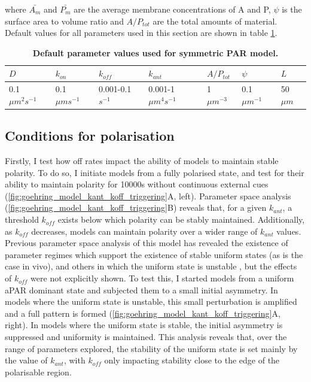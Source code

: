 \documentclass[12pt]{"report"}
\newcommand{\mycaption}[2]{\caption[#1]{\textbf{#1.} #2}}
\begin{document}
where $\bar{A_m}$ and $\bar{P_m}$ are the average membrane concentrations of A and P, $\psi$ is the surface area to volume ratio and $A/P_{tot}$ are the total amounts of material. Default values for all parameters used in this section are shown in table \ref{tab:goehring_model_default_parameters}.

\begin{table}[]
\scriptsize
\begin{tabular}{lllllll}
$D$ & $k_{on}$ & $k_{off}$ & $k_{ant}$ & $A/P_{tot}$ & $\psi$ & $L$ \\ \hline
0.1 $\mu m^2 s^{-1}$ & 0.1 $\mu m s^{-1}$ & 0.001-0.1 $s^{-1}$ & 0.001-1 $\mu m^4 s^{-1}$ & 1 $\mu m^{-3}$ & 0.1 $\mu m^{-1}$ & 50 $\mu m$
\end{tabular}
\mycaption{Default parameter values used for symmetric PAR model}{}
\label{tab:goehring_model_default_parameters}
\end{table}

\subsection{Conditions for polarisation}

Firstly, I test how off rates impact the ability of models to maintain stable polarity. To do so, I initiate models from a fully polarised state, and test for their ability to maintain polarity for 10000s without continuous external cues (\ref{fig:goehring_model_kant_koff_triggering}A, left). Parameter space analysis (\cref{fig:goehring_model_kant_koff_triggering}B) reveals that, for a given $k_{ant}$, a threshold $k_{off}$ exists below which polarity can be stably maintained. Additionally, as $k_{off}$ decreases, models can maintain polarity over a wider range of $k_{ant}$ values.\\

Previous parameter space analysis of this model has revealed the existence of parameter regimes which support the existence of stable uniform states (as is the case in vivo), and others in which the uniform state is unstable \citep{Goehring2011a, Trong2014}, but the effects of $k_{off}$ were not explicitly shown. To test this, I started models from a uniform aPAR dominant state and subjected them to a small initial asymmetry. In models where the uniform state is unstable, this small perturbation is amplified and a full pattern is formed (\ref{fig:goehring_model_kant_koff_triggering}A, right). In models where the uniform state is stable, the initial asymmetry is suppressed and uniformity is maintained. This analysis reveals that, over the range of parameters explored, the stability of the uniform state is set mainly by the value of $k_{ant}$, with $k_{off}$ only impacting stability close to the edge of the polarisable region.
\end{document}
